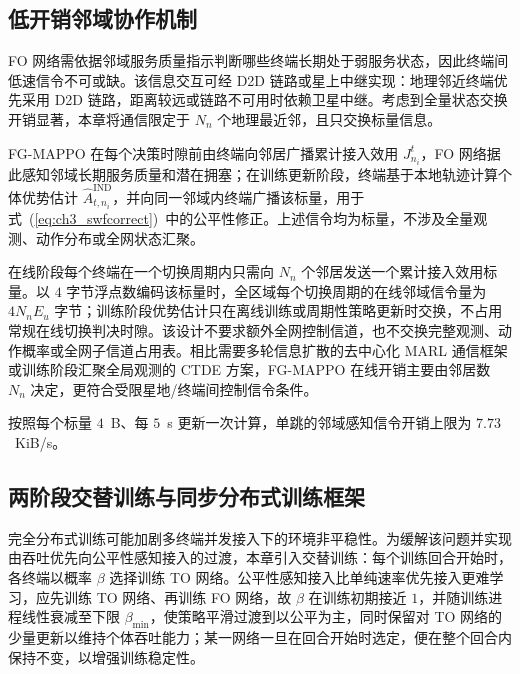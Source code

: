 \subsection{低开销邻域协作机制}
\label{subsec:ch3_comm}

FO 网络需依据邻域服务质量指示判断哪些终端长期处于弱服务状态，因此终端间低速信令不可或缺。该信息交互可经 D2D 链路或星上中继实现：地理邻近终端优先采用 D2D 链路，距离较远或链路不可用时依赖卫星中继。考虑到全量状态交换开销显著，本章将通信限定于 $N_n$ 个地理最近邻，且只交换标量信息。

FG-MAPPO 在每个决策时隙前由终端向邻居广播累计接入效用 $J_{n_i}^t$，FO 网络据此感知邻域长期服务质量和潜在拥塞；在训练更新阶段，终端基于本地轨迹计算个体优势估计 $\hat{A}_{t,n_i}^{\mathrm{IND}}$，并向同一邻域内终端广播该标量，用于式~(\ref{eq:ch3_swfcorrect})~中的公平性修正。上述信令均为标量，不涉及全量观测、动作分布或全网状态汇聚。

在线阶段每个终端在一个切换周期内只需向 $N_n$ 个邻居发送一个累计接入效用标量。以 $4$ 字节浮点数编码该标量时，全区域每个切换周期的在线邻域信令量为 $4N_nE_u$ 字节；训练阶段优势估计只在离线训练或周期性策略更新时交换，不占用常规在线切换判决时隙。该设计不要求额外全网控制信道，也不交换完整观测、动作概率或全网子信道占用表。相比需要多轮信息扩散的去中心化 MARL 通信框架或训练阶段汇聚全局观测的 CTDE 方案，FG-MAPPO 在线开销主要由邻居数 $N_n$ 决定，更符合受限星地/终端间控制信令条件。

按照每个标量 $4$~B、每 $5$~s 更新一次计算，单跳的邻域感知信令开销上限为 $7.73$~KiB/s。

\subsection{两阶段交替训练与同步分布式训练框架}
\label{subsec:ch3_training}

完全分布式训练可能加剧多终端并发接入下的环境非平稳性。为缓解该问题并实现由吞吐优先向公平性感知接入的过渡，本章引入交替训练：每个训练回合开始时，各终端以概率 $\beta$ 选择训练 TO 网络。公平性感知接入比单纯速率优先接入更难学习，应先训练 TO 网络、再训练 FO 网络，故 $\beta$ 在训练初期接近 $1$，并随训练进程线性衰减至下限 $\beta_{\min}$，使策略平滑过渡到以公平为主，同时保留对 TO 网络的少量更新以维持个体吞吐能力；某一网络一旦在回合开始时选定，便在整个回合内保持不变，以增强训练稳定性。

